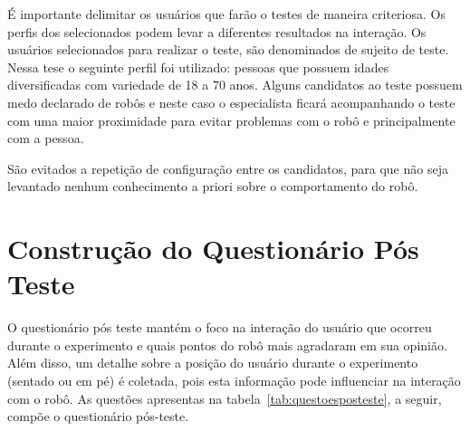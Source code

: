 É importante delimitar os usuários que farão o testes de maneira criteriosa. Os perfis dos selecionados podem levar a diferentes resultados na interação. Os usuários selecionados para realizar o teste, são denominados de sujeito de teste. Nessa tese o seguinte perfil foi utilizado: pessoas que possuem idades diversificadas com variedade de 18 a 70 anos. Alguns candidatos ao teste possuem medo declarado de robôs e neste caso o especialista ficará acompanhando o teste com uma maior proximidade para evitar problemas com o robô e principalmente com a pessoa.

São evitados a repetição de configuração entre os candidatos, para que não seja levantado nenhum conhecimento a priori sobre o comportamento do robô.

\section{Construção do Questionário Pós Teste}
\label{sec:questionarioposteste}
O questionário pós teste mantém o foco na interação do usuário que ocorreu durante o experimento e quais pontos do robô mais agradaram em sua opinião. Além disso, um detalhe sobre a posição do usuário durante o experimento (sentado ou em pé) é coletada, pois esta informação pode influenciar na interação com o robô. As questões apresentas na tabela~\ref{tab:questoesposteste}, a seguir, compõe o questionário pós-teste.

